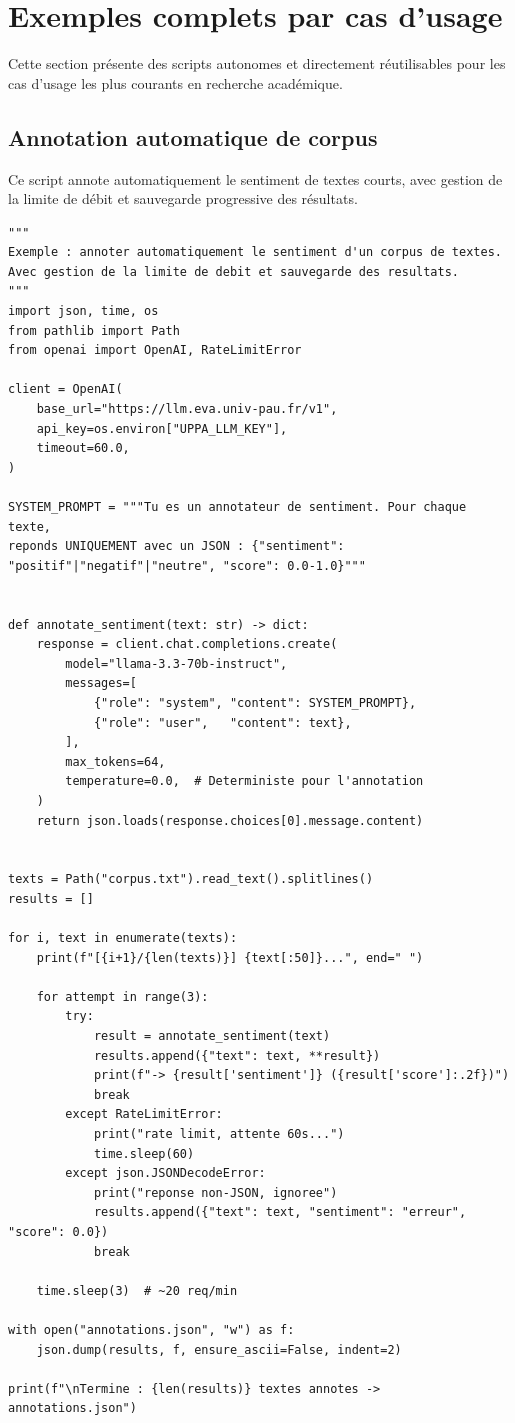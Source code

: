 \documentclass[12pt, a4paper, twoside]{article}
\begin{document}
\section{Exemples complets par cas d'usage}
\label{sec:exemples}

Cette section présente des scripts autonomes et directement réutilisables pour les
cas d'usage les plus courants en recherche académique.

\subsection{Annotation automatique de corpus}

Ce script annote automatiquement le sentiment de textes courts, avec gestion de la
limite de débit et sauvegarde progressive des résultats.

\begin{lstlisting}[style=pythonstyle, caption={Annotation de sentiment sur un corpus}]
"""
Exemple : annoter automatiquement le sentiment d'un corpus de textes.
Avec gestion de la limite de debit et sauvegarde des resultats.
"""
import json, time, os
from pathlib import Path
from openai import OpenAI, RateLimitError

client = OpenAI(
    base_url="https://llm.eva.univ-pau.fr/v1",
    api_key=os.environ["UPPA_LLM_KEY"],
    timeout=60.0,
)

SYSTEM_PROMPT = """Tu es un annotateur de sentiment. Pour chaque texte,
reponds UNIQUEMENT avec un JSON : {"sentiment": "positif"|"negatif"|"neutre", "score": 0.0-1.0}"""


def annotate_sentiment(text: str) -> dict:
    response = client.chat.completions.create(
        model="llama-3.3-70b-instruct",
        messages=[
            {"role": "system", "content": SYSTEM_PROMPT},
            {"role": "user",   "content": text},
        ],
        max_tokens=64,
        temperature=0.0,  # Deterministe pour l'annotation
    )
    return json.loads(response.choices[0].message.content)


texts = Path("corpus.txt").read_text().splitlines()
results = []

for i, text in enumerate(texts):
    print(f"[{i+1}/{len(texts)}] {text[:50]}...", end=" ")

    for attempt in range(3):
        try:
            result = annotate_sentiment(text)
            results.append({"text": text, **result})
            print(f"-> {result['sentiment']} ({result['score']:.2f})")
            break
        except RateLimitError:
            print("rate limit, attente 60s...")
            time.sleep(60)
        except json.JSONDecodeError:
            print("reponse non-JSON, ignoree")
            results.append({"text": text, "sentiment": "erreur", "score": 0.0})
            break

    time.sleep(3)  # ~20 req/min

with open("annotations.json", "w") as f:
    json.dump(results, f, ensure_ascii=False, indent=2)

print(f"\nTermine : {len(results)} textes annotes -> annotations.json")
\end{lstlisting}
\end{document}
